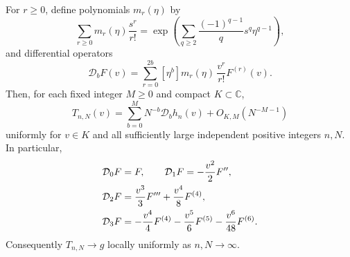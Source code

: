 \begin{lemma}
\label{lem:reciprocal-saddle}
For $r\geq0$, define polynomials $m_r(\eta)$ by
\begin{equation}\label{eq:saddle-moment-generating-function}
 \sum_{r\geq0}m_r(\eta)\frac{s^r}{r!}
  =\exp\left(\sum_{q\geq2}
        \frac{(-1)^{q-1}}q s^q\eta^{q-1}\right),
\end{equation}
and differential operators
\begin{equation}\label{eq:saddle-operator-definition}
 \mathcal D_b F(v)=\sum_{r=0}^{2b}
       [\eta^b]m_r(\eta)\,\frac{v^r}{r!}F^{(r)}(v).
\end{equation}
Then, for each fixed integer $M\geq0$ and compact $K\subset\mathbb C$,
\begin{equation}\label{eq:log-free-saddle-expansion}
 T_{n,N}(v)=\sum_{b=0}^{M}N^{-b}\mathcal D_bh_n(v)
             +O_{K,M}(N^{-M-1})
\end{equation}
uniformly for $v\in K$ and all sufficiently large independent
positive integers $n,N$.  In particular,
\begin{align}\label{eq:first-saddle-operators}
 \mathcal D_0F&=F,\qquad
 \mathcal D_1F=-\frac{v^2}{2}F'',\\
 \mathcal D_2F&=\frac{v^3}{3}F'''+\frac{v^4}{8}F^{(4)},\notag\\
 \mathcal D_3F&=-\frac{v^4}{4}F^{(4)}
                 -\frac{v^5}{6}F^{(5)}
                 -\frac{v^6}{48}F^{(6)}.\notag
\end{align}
Consequently $T_{n,N}\to g$ locally uniformly as $n,N\to\infty$.
\end{lemma}

